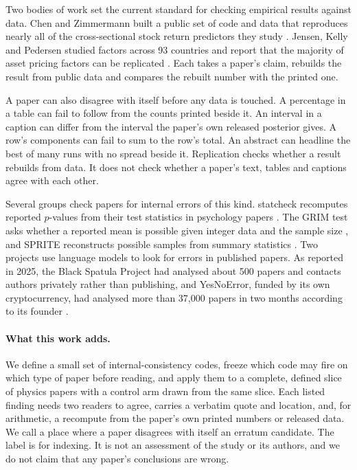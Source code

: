 \documentclass[reprint,amsmath,amssymb,aps,superscriptaddress,nofootinbib]{revtex4-2}
\begin{document}
Two bodies of work set the current standard for checking empirical results against data. Chen and Zimmermann built a public set of code and data that reproduces nearly all of the cross-sectional stock return predictors they study \cite{ChenZimmermann2022}. Jensen, Kelly and Pedersen studied factors across 93 countries and report that the majority of asset pricing factors can be replicated \cite{JKP2023}. Each takes a paper's claim, rebuilds the result from public data and compares the rebuilt number with the printed one.

A paper can also disagree with itself before any data is touched. A percentage in a table can fail to follow from the counts printed beside it. An interval in a caption can differ from the interval the paper's own released posterior gives. A row's components can fail to sum to the row's total. An abstract can headline the best of many runs with no spread beside it. Replication checks whether a result rebuilds from data. It does not check whether a paper's text, tables and captions agree with each other.

Several groups check papers for internal errors of this kind. statcheck recomputes reported $p$-values from their test statistics in psychology papers \cite{Nuijten2016}. The GRIM test asks whether a reported mean is possible given integer data and the sample size \cite{BrownHeathers2017}, and SPRITE reconstructs possible samples from summary statistics \cite{Heathers2018}. Two projects use language models to look for errors in published papers. As reported in 2025, the Black Spatula Project had analysed about 500 papers and contacts authors privately rather than publishing, and YesNoError, funded by its own cryptocurrency, had analysed more than 37,000 papers in two months according to its founder \cite{Gibney2025}.

\paragraph*{What this work adds.} We define a small set of internal-consistency codes, freeze which code may fire on which type of paper before reading, and apply them to a complete, defined slice of physics papers with a control arm drawn from the same slice. Each listed finding needs two readers to agree, carries a verbatim quote and location, and, for arithmetic, a recompute from the paper's own printed numbers or released data. We call a place where a paper disagrees with itself an erratum candidate. The label is for indexing. It is not an assessment of the study or its authors, and we do not claim that any paper's conclusions are wrong.
\end{document}
